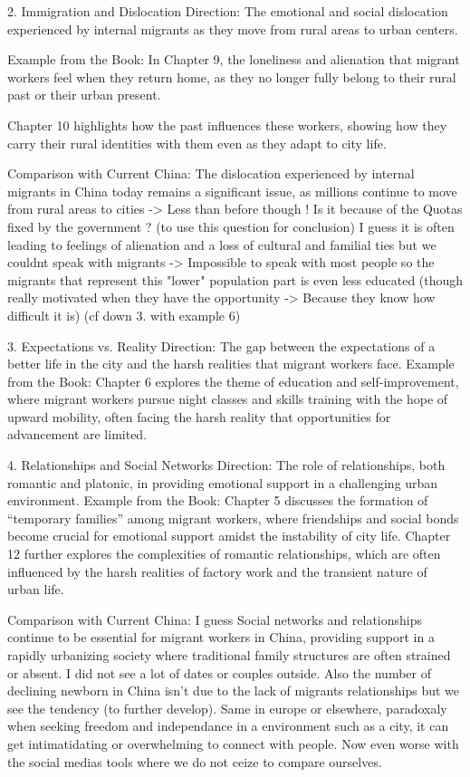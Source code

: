 2. Immigration and Dislocation
Direction: The emotional and social dislocation experienced by internal migrants as they move from rural areas to urban centers.

Example from the Book:
In Chapter 9, the loneliness and alienation that migrant workers feel when they return home, as they no longer fully belong to their rural past or their urban present.

Chapter 10 highlights how the past influences these workers, showing how they carry their rural identities with them even as they adapt to city life.

Comparison with Current China:
The dislocation experienced by internal migrants in China today remains a significant issue, as millions continue to move from rural areas to cities -> Less than before though ! Is it because of the Quotas fixed by the government ? (to use this question for conclusion) I guess it is often leading to feelings of alienation and a loss of cultural and familial ties but we couldnt speak with migrants -> Impossible to speak with most people so the migrants that represent this "lower" population part is even less educated (though really motivated when they have the opportunity -> Because they know how difficult it is) (cf down 3. with example 6)


3. Expectations vs. Reality
Direction: The gap between the expectations of a better life in the city and the harsh realities that migrant workers face.
Example from the Book:
Chapter 6 explores the theme of education and self-improvement, where migrant workers pursue night classes and skills training with the hope of upward mobility, often facing the harsh reality that opportunities for advancement are limited.


4. Relationships and Social Networks
Direction: The role of relationships, both romantic and platonic, in providing emotional support in a challenging urban environment.
Example from the Book:
Chapter 5 discusses the formation of “temporary families” among migrant workers, where friendships and social bonds become crucial for emotional support amidst the instability of city life.
Chapter 12 further explores the complexities of romantic relationships, which are often influenced by the harsh realities of factory work and the transient nature of urban life.

Comparison with Current China:
I guess Social networks and relationships continue to be essential for migrant workers in China, providing support in a rapidly urbanizing society where traditional family structures are often strained or absent. I did not see a lot of dates or couples outside. Also the number of declining newborn in China isn't due to the lack of migrants relationships but we see the tendency (to further develop). Same in europe or elsewhere, paradoxaly when seeking freedom and independance in a environment such as a city, it can get intimatidating or overwhelming to connect with people. Now even worse with the social medias tools where we do not ceize to compare ourselves. 


